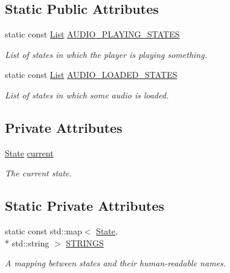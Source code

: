 \subsection*{Static Public Attributes}
\begin{DoxyCompactItemize}
\item 
static const \hyperlink{classPlayerState_a0f4e455f0579f97740855ccc6177c9f1}{List} \hyperlink{classPlayerState_aa5e7203a1fa44e8bceffe65b6ad2c554}{A\+U\+D\+I\+O\+\_\+\+P\+L\+A\+Y\+I\+N\+G\+\_\+\+S\+T\+A\+T\+E\+S}
\begin{DoxyCompactList}\small\item\em List of states in which the player is playing something. \end{DoxyCompactList}\item 
static const \hyperlink{classPlayerState_a0f4e455f0579f97740855ccc6177c9f1}{List} \hyperlink{classPlayerState_a850bf90685a377001cfc46808cf017a4}{A\+U\+D\+I\+O\+\_\+\+L\+O\+A\+D\+E\+D\+\_\+\+S\+T\+A\+T\+E\+S}
\begin{DoxyCompactList}\small\item\em List of states in which some audio is loaded. \end{DoxyCompactList}\end{DoxyCompactItemize}
\subsection*{Private Attributes}
\begin{DoxyCompactItemize}
\item 
\hypertarget{classPlayerState_add16beba271881c0e1e40430b80f5bd6}{\hyperlink{classPlayerState_ab013f68ff23d69d677faae624b5dff07}{State} \hyperlink{classPlayerState_add16beba271881c0e1e40430b80f5bd6}{current}}\label{classPlayerState_add16beba271881c0e1e40430b80f5bd6}

\begin{DoxyCompactList}\small\item\em The current state. \end{DoxyCompactList}\end{DoxyCompactItemize}
\subsection*{Static Private Attributes}
\begin{DoxyCompactItemize}
\item 
static const std\+::map$<$ \hyperlink{classPlayerState_ab013f68ff23d69d677faae624b5dff07}{State}, \\*
std\+::string $>$ \hyperlink{classPlayerState_af9cd9cd0e2d4c24e59ea11d35bdaff78}{S\+T\+R\+I\+N\+G\+S}
\begin{DoxyCompactList}\small\item\em A mapping between states and their human-\/readable names. \end{DoxyCompactList}\end{DoxyCompactItemize}
